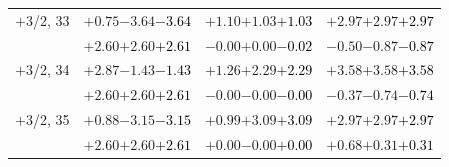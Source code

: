\documentclass[compress]{beamer}
\begin{document}
\begin{frame}
\begin{tabular}{r | c | c | c}
$+$3/2, 33 & $+0.75$\hspace{0.1 cm}$-3.64$\hspace{0.1 cm}\textcolor{black}{$-3.64$} & $+1.10$\hspace{0.1 cm}$+1.03$\hspace{0.1 cm}\textcolor{black}{$+1.03$} & $+2.97$\hspace{0.1 cm}$+2.97$\hspace{0.1 cm}\textcolor{black}{$+2.97$} \\
           & $+2.60$\hspace{0.1 cm}$+2.60$\hspace{0.1 cm}\textcolor{black}{$+2.61$} & $-0.00$\hspace{0.1 cm}$+0.00$\hspace{0.1 cm}\textcolor{black}{$-0.02$} & $-0.50$\hspace{0.1 cm}$-0.87$\hspace{0.1 cm}\textcolor{black}{$-0.87$} \\
$+$3/2, 34 & $+2.87$\hspace{0.1 cm}$-1.43$\hspace{0.1 cm}\textcolor{black}{$-1.43$} & $+1.26$\hspace{0.1 cm}$+2.29$\hspace{0.1 cm}\textcolor{black}{$+2.29$} & $+3.58$\hspace{0.1 cm}$+3.58$\hspace{0.1 cm}\textcolor{black}{$+3.58$} \\
           & $+2.60$\hspace{0.1 cm}$+2.60$\hspace{0.1 cm}\textcolor{black}{$+2.61$} & $-0.00$\hspace{0.1 cm}$-0.00$\hspace{0.1 cm}\textcolor{black}{$-0.00$} & $-0.37$\hspace{0.1 cm}$-0.74$\hspace{0.1 cm}\textcolor{black}{$-0.74$} \\
$+$3/2, 35 & $+0.88$\hspace{0.1 cm}$-3.15$\hspace{0.1 cm}\textcolor{black}{$-3.15$} & $+0.99$\hspace{0.1 cm}$+3.09$\hspace{0.1 cm}\textcolor{black}{$+3.09$} & $+2.97$\hspace{0.1 cm}$+2.97$\hspace{0.1 cm}\textcolor{black}{$+2.97$} \\
           & $+2.60$\hspace{0.1 cm}$+2.60$\hspace{0.1 cm}\textcolor{black}{$+2.61$} & $+0.00$\hspace{0.1 cm}$-0.00$\hspace{0.1 cm}\textcolor{black}{$+0.00$} & $+0.68$\hspace{0.1 cm}$+0.31$\hspace{0.1 cm}\textcolor{black}{$+0.31$} \\

\end{tabular}
\end{frame}
\end{document}
